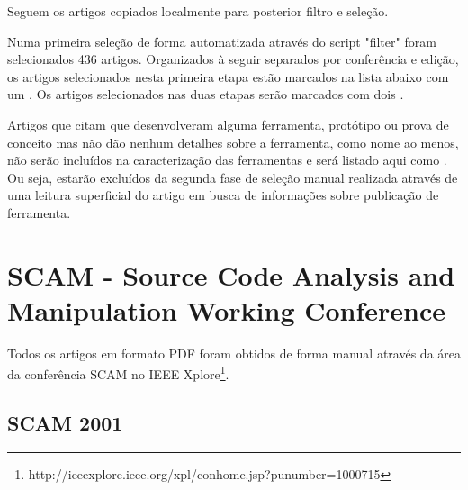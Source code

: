Seguem os artigos copiados localmente para posterior filtro e seleção.

Numa primeira seleção de forma automatizada através do script "filter" foram
selecionados 436 artigos. Organizados à seguir separados por conferência e
edição, os artigos selecionados nesta primeira etapa estão marcados na lista
abaixo com um {\color{blue} \checkmark}. Os artigos selecionados nas duas
etapas serão marcados com dois {\color{blue} \checkmark \checkmark}.

Artigos que citam que desenvolveram alguma ferramenta, protótipo ou prova de
conceito mas não dão nenhum detalhes sobre a ferramenta, como nome ao menos,
não serão incluídos na caracterização das ferramentas e será listado aqui como
{\color{blue} \checkmark}{\color{red} \texttimes}. Ou seja, estarão excluídos
da segunda fase de seleção manual realizada através de uma leitura superficial
do artigo em busca de informações sobre publicação de ferramenta.

%
%
%
%
%
%
%

\section{SCAM - Source Code Analysis and Manipulation Working Conference}

Todos os artigos em formato PDF foram obtidos de forma manual através da área
da conferência SCAM no IEEE
Xplore\footnote{http://ieeexplore.ieee.org/xpl/conhome.jsp?punumber=1000715}.

\subsection{SCAM 2001}

